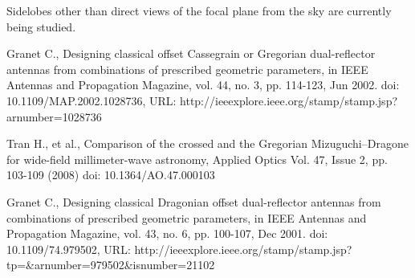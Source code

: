 \documentclass[11pt,a4paper]{article}
\begin{document}
Sidelobes 
other than direct views of the focal plane from 
the sky are currently being studied.




%
\clearpage
\newpage
\begin{thebibliography}{99}
	
	 Granet C., Designing classical offset Cassegrain or Gregorian dual-reflector antennas from combinations of prescribed geometric parameters, 
	in IEEE Antennas and Propagation Magazine, vol. 44, no. 3, pp. 114-123, Jun 2002.
	doi: 10.1109/MAP.2002.1028736,
	URL: http://ieeexplore.ieee.org/stamp/stamp.jsp?arnumber=1028736

	 Tran H., et al., Comparison of the crossed and the Gregorian Mizuguchi–Dragone for wide-field millimeter-wave astronomy, Applied Optics Vol. 47, Issue 2, pp. 103-109 (2008)  doi: 10.1364/AO.47.000103
	
	 Granet C., Designing classical Dragonian offset dual-reflector antennas from combinations of prescribed geometric parameters, 
	in IEEE Antennas and Propagation Magazine, vol. 43, no. 6, pp. 100-107, Dec 2001.
	doi: 10.1109/74.979502,
	URL: http://ieeexplore.ieee.org/stamp/stamp.jsp?tp=\&arnumber=979502\&isnumber=21102
	
	
	
	
	
	
	
\end{thebibliography}
\end{document}
